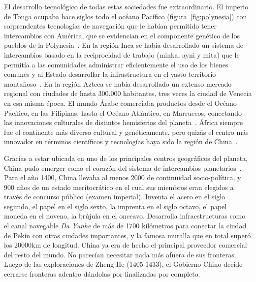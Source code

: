 \documentclass[a4paper,10pt]{book}
\theoremstyle{definition}
\begin{document}
El desarrollo tecnológico de todas estas sociedades fue extraordinario. 
El imperio de Tonga ocupaba hace siglos todo el oc\'eano Pac\'ifico (figura~\ref{fig:polynesia}) con sorprendentes tecnologías de navegación que le habían permitido tener intercambios con América, que se evidencian en el componente genético de los pueblos de la Polynesia~\cite{thorsby2016-polynesiaAmerica, ioannidis2020-polynesiaAmerica}.
En la región Inca se había desarrollado un sistema de intercambios basado en la reciprocidad de trabajo (minka, ayni y mita) que le permitía a las comunidades administrar eficientemente el uso de los bienes comunes y al Estado desarrollar la infrastructura en el vasto territorio montañoso~\cite{murra1978-organizacion}.
En la región Azteca se había desarrollado un extenso mercado regional con ciudades de hasta 300.000 habitantes, tres veces la ciudad de Venecia en esa misma época.%
El mundo \'Arabe comerciaba productos desde el Océano Pacífico, en las Filipinas, hasta el Oc\'eano Atl\'antico, en Marruecos, conectando las innovaciones culturales de distintos hemisferios del planeta~\cite{dussel2004-sistemaMundo}.
África siempre fue el continente más diverso cultural y genéticamente, pero quizás el centro más innovador en términos científicos y tecnologías haya sido la región de China~\cite{needham2004-generalConclusionsAndReflections}.


Gracias a estar ubicada en uno de los principales centros geográficos del planeta, China pudo emerger como el corazón del sistema de intercambios planetarios~\cite{pomeranz2000-divergence}.
Para el año 1400, China llevaba al menos 2000 de continuidad socio-pol\'itica, y 900 a\~nos de un estado meritocr\'atico en el cual sus miembros eran elegidos a trav\'es de concurso público (examen imperial).
Inventa el acero en el siglo segundo, el papel en el siglo sexto, la imprenta en el siglo octavo, el papel moneda en el noveno, la br\'ujula en el onceavo.
Desarrolla infraestructuras como el canal navegable \emph{Da Yunhe} de más de 1700 kilómetros para conectar la ciudad de Pekín con otras ciudades importantes, y la famosa muralla que en total superó los 20000km de longitud.
China ya era de hecho el principal proveedor comercial del resto del mundo.
No parecían necesitar nada más afuera de sus fronteras.
Luego de las exploraciones de Zheng He (1405-1433), el Gobierno Chino decide cerrarse fronteras adentro dándolas por finalizadas por completo.

\end{document}
